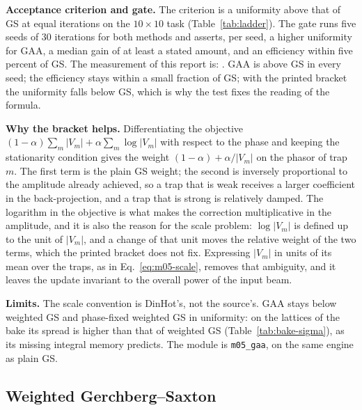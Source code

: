 \textbf{Acceptance criterion and gate.} The criterion is a uniformity above that of GS at equal iterations on the $10\times10$ task (Table~\ref{tab:ladder}). The gate runs five seeds of 30 iterations for both methods and asserts, per seed, a higher uniformity for GAA, a median gain of at least a stated amount, and an efficiency within five percent of GS. The measurement of this report is: . GAA is above GS in every seed; the efficiency stays within a small fraction of GS; with the printed bracket the uniformity falls below GS, which is why the test fixes the reading of the formula.

\textbf{Why the bracket helps.} Differentiating the objective $(1-\alpha)\sum_m|V_m|+\alpha\sum_m\log|V_m|$ with respect to the phase and keeping the stationarity condition gives the weight $(1-\alpha)+\alpha/|V_m|$ on the phasor of trap $m$. The first term is the plain GS weight; the second is inversely proportional to the amplitude already achieved, so a trap that is weak receives a larger coefficient in the back-projection, and a trap that is strong is relatively damped. The logarithm in the objective is what makes the correction multiplicative in the amplitude, and it is also the reason for the scale problem: $\log|V_m|$ is defined up to the unit of $|V_m|$, and a change of that unit moves the relative weight of the two terms, which the printed bracket does not fix. Expressing $|V_m|$ in units of its mean over the traps, as in Eq.~\eqref{eq:m05-scale}, removes that ambiguity, and it leaves the update invariant to the overall power of the input beam.

\textbf{Limits.} The scale convention is DinHot's, not the source's. GAA stays below weighted GS and phase-fixed weighted GS in uniformity: on the lattices of the bake its spread is higher than that of weighted GS (Table~\ref{tab:bake-sigma}), as its missing integral memory predicts. The module is \texttt{m05\_gaa}, on the same engine as plain GS.

\subsection{Weighted Gerchberg--Saxton}\label{sec:m06}

